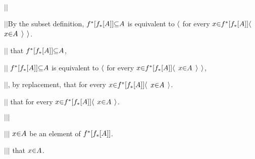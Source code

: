     $|$\hs$|$\hs \par
    $|$\hs$|$\hs By the subset definition, $f^*[f_*[\g A]] \p\subseteq \g A$ is equivalent to $\a\langle$ for every $x \p\in f^*[f_*[\g A]] \a\langle$ $x \p\in \g A$ $\a\rangle$ $\a\rangle$. \par
    $|$\hs$|$\hs {}  that $f^*[f_*[\g A]] \p\subseteq \g A$, \par
    $|$\hs$|$\hs {} $f^*[f_*[\g A]] \p\subseteq \g A$ is equivalent to $\a\langle$ for every $x \p\in f^*[f_*[\g A]] \a\langle$ $x \p\in \g A$ $\a\rangle$ $\a\rangle$, \par
    $|$\hs$|$\hs {}, by replacement,  that for every $x \p\in f^*[f_*[\g A]] \a\langle$ $x \p\in \g A$ $\a\rangle$. \par
    $|$\hs$|$\hs {} that for every $x \p\in f^*[f_*[\g A]] \a\langle$ $x \p\in \g A$ $\a\rangle$. \par

      $|$\hs$|$\hs$|$\hs \par
      $|$\hs$|$\hs$|$\hs {} $x \p\in \g A$ be an element of $f^*[f_*[\g A]]$. \par
      $|$\hs$|$\hs$|$\hs {} that $x \p\in \g A$. \par

